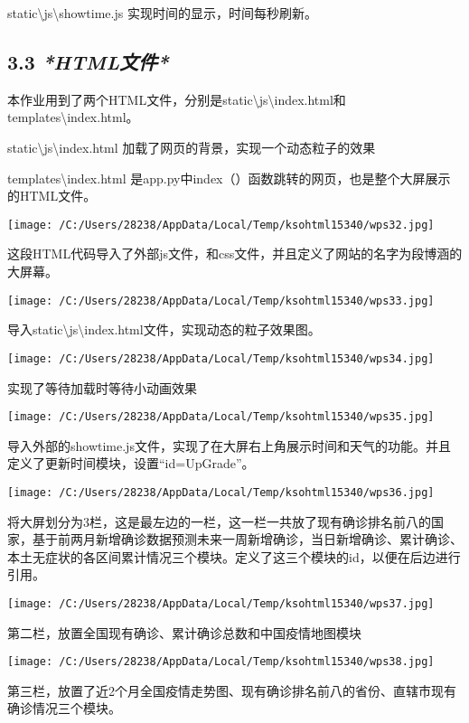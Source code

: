 \documentclass[
]{article}
\begin{document}
static\textbackslash js\textbackslash showtime.js
实现时间的显示，时间每秒刷新。

\hypertarget{33-htmlux6587ux4ef6}{%
\subsection{\texorpdfstring{\textbf{3.3}
\emph{\textbf{*HTML文件*}}}{3.3 *HTML文件*}}\label{33-htmlux6587ux4ef6}}

本作业用到了两个HTML文件，分别是static\textbackslash js\textbackslash index.html和templates\textbackslash index.html。

static\textbackslash js\textbackslash index.html
加载了网页的背景，实现一个动态粒子的效果

templates\textbackslash index.html
是app.py中index（）函数跳转的网页，也是整个大屏展示的HTML文件。

\texttt{[image: /C:/Users/28238/AppData/Local/Temp/ksohtml15340/wps32.jpg]}

这段HTML代码导入了外部js文件，和css文件，并且定义了网站的名字为段博涵的大屏幕。

\texttt{[image: /C:/Users/28238/AppData/Local/Temp/ksohtml15340/wps33.jpg]}

导入static\textbackslash js\textbackslash index.html文件，实现动态的粒子效果图。

\texttt{[image: /C:/Users/28238/AppData/Local/Temp/ksohtml15340/wps34.jpg]}

实现了等待加载时等待小动画效果

\texttt{[image: /C:/Users/28238/AppData/Local/Temp/ksohtml15340/wps35.jpg]}

导入外部的showtime.js文件，实现了在大屏右上角展示时间和天气的功能。并且定义了更新时间模块，设置``id=UpGrade''。

\texttt{[image: /C:/Users/28238/AppData/Local/Temp/ksohtml15340/wps36.jpg]}

将大屏划分为3栏，这是最左边的一栏，这一栏一共放了现有确诊排名前八的国家，基于前两月新增确诊数据预测未来一周新增确诊，当日新增确诊、累计确诊、本土无症状的各区间累计情况三个模块。定义了这三个模块的id，以便在后边进行引用。

\texttt{[image: /C:/Users/28238/AppData/Local/Temp/ksohtml15340/wps37.jpg]}

第二栏，放置全国现有确诊、累计确诊总数和中国疫情地图模块

\texttt{[image: /C:/Users/28238/AppData/Local/Temp/ksohtml15340/wps38.jpg]}

第三栏，放置了近2个月全国疫情走势图、现有确诊排名前八的省份、直辖市现有确诊情况三个模块。
\end{document}
